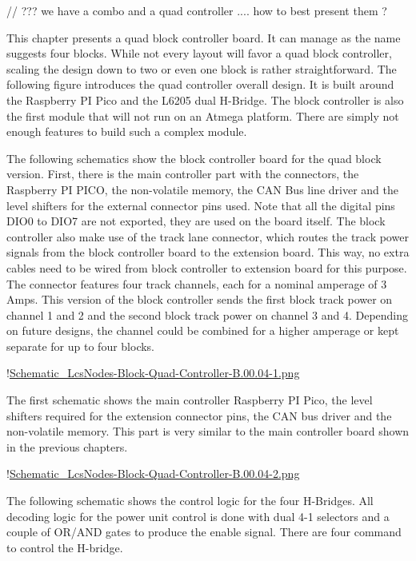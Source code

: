 

// ??? we have a combo and a quad controller .... how to best present them ?

This chapter presents a quad block controller board. It can manage as the name suggests four blocks. While not every layout will favor a quad block controller, scaling the design down to two or even one block is rather straightforward. The following figure introduces the quad controller overall design. It is built around the Raspberry PI Pico and the L6205 dual H-Bridge. The block controller is also the first module that will not run on an Atmega platform. There are simply not enough features to build such a complex module.

The following schematics show the block controller board for the quad block version. First, there is the main controller part with the connectors, the Raspberry PI PICO, the non-volatile memory, the CAN Bus line driver and the level shifters for the external connector pins used. Note that all the digital pins DIO0 to DIO7 are not exported, they are used on the board itself. The block controller also make use of the track lane connector, which routes the track power signals from the block controller board to the extension board. This way, no extra cables need to be wired from block controller to extension board for this purpose. The connector features four track channels, each for a nominal amperage of 3 Amps. This version of the block controller sends the first block track power on channel 1 and 2 and the second block track power on channel 3 and 4. Depending on future designs, the channel could be combined for a higher amperage or kept separate for up to four blocks.

!\href{./Schematics/Schematic_LcsNodes-Block-Quad-Controller-B.00.04-1.png }{Schematic_LcsNodes-Block-Quad-Controller-B.00.04-1.png}

The first schematic shows the main controller Raspberry PI Pico, the level shifters required for the extension connector pins, the CAN bus driver and the non-volatile memory. This part is very similar to the main controller board shown in the previous chapters.

!\href{./Schematics/Schematic_LcsNodes-Block-Quad-Controller-B.00.04-2.png }{Schematic_LcsNodes-Block-Quad-Controller-B.00.04-2.png}

The following schematic shows the control logic for the four H-Bridges. All decoding logic for the power unit control is done with dual 4-1 selectors and a couple of OR/AND gates to produce the enable signal. There are four command to control the H-bridge.

